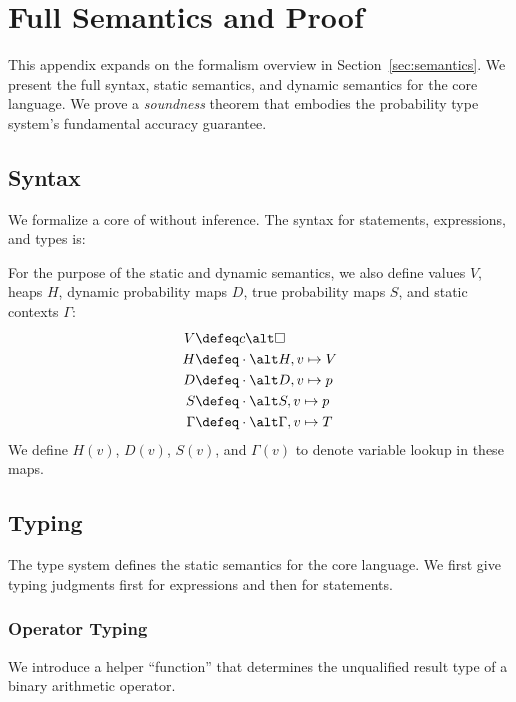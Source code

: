 \section{Full Semantics and Proof}
\label{app:semantics}

This appendix expands on the formalism overview in
Section~\ref{sec:semantics}.
We present the full syntax, static semantics, and dynamic semantics for the
core \lang language.
We prove a \emph{soundness} theorem that embodies the probability type
system's fundamental accuracy guarantee.

\subsection{Syntax}

We formalize a core of \lang without inference.
The syntax for statements, expressions, and types is:
%

%
For the purpose of the static and dynamic semantics, we also define values $V$, heaps
$H$, dynamic probability maps $D$, true probability maps $S$, and static
contexts $\Gamma$:
%
\begin{align*}
    V &\defeq
        c \alt
        \Box \\
    H &\defeq
        \cdot \alt
        H, v \mapsto V \\
    D &\defeq
        \cdot \alt
        D, v \mapsto p \\
    S &\defeq
        \cdot \alt
        S, v \mapsto p \\
    \Gamma &\defeq
        \cdot \alt
        \Gamma, v \mapsto T
\end{align*}
%
We define $H(v)$, $D(v)$, $S(v)$, and $\Gamma(v)$ to denote variable lookup in
these maps.


\subsection{Typing}

The type system defines the static semantics for the core language. We first
give typing judgments first for expressions and then for statements.

\subsubsection{Operator Typing}

We introduce a helper ``function'' that determines the unqualified result type
of a binary arithmetic operator.

